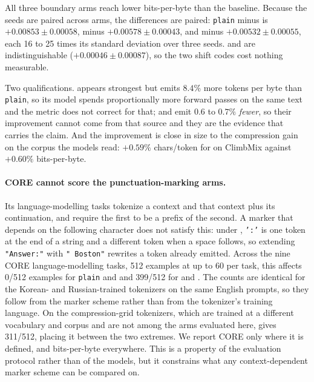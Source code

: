 \providecommand{\downstreamdir}{.}


All three boundary arms reach lower bits-per-byte than the baseline. Because the seeds are
paired across arms, the differences are paired: \texttt{plain} minus  is
$+0.00853 \pm 0.00058$, minus  $+0.00578 \pm 0.00043$, and minus 
$+0.00532 \pm 0.00055$, each 16 to 25 times its standard deviation over three seeds.
 and  are indistinguishable ($+0.00046 \pm 0.00087$), so the two
shift codes cost nothing measurable.

Two qualifications.  appears strongest but emits $8.4\%$ more tokens per byte than
\texttt{plain}, so its model spends proportionally more forward passes on the same text and
the metric does not correct for that;  and  emit $0.6$ to $0.7\%$
\emph{fewer}, so their improvement cannot come from that source and they are the evidence
that carries the claim. And the improvement is close in size to the compression gain on the
corpus the models read: $+0.59\%$ chars/token for  on ClimbMix against $+0.60\%$
bits-per-byte.

\paragraph{CORE cannot score the punctuation-marking arms.} Its language-modelling tasks
tokenize a context and that context plus its continuation, and require the first to be a
prefix of the second. A marker that depends on the following character does not satisfy this:
under , \texttt{':'} is one token at the end of a string and a different token when a
space follows, so extending \texttt{"Answer:"} with \texttt{" Boston"} rewrites a token
already emitted. Across the nine CORE language-modelling tasks, 512 examples at up to 60 per
task, this affects 0/512 examples for \texttt{plain} and  and 399/512 for 
and . The counts are identical for the Korean- and Russian-trained tokenizers
on the same English prompts, so they follow from the marker scheme rather than from the
tokenizer's training language. On the compression-grid tokenizers, which are trained at a
different vocabulary and corpus and are not among the arms evaluated here,  gives
311/512, placing it between the two extremes. We report CORE
only where it is defined, and bits-per-byte everywhere. This is a property of the evaluation
protocol rather than of the models, but it constrains what any context-dependent marker scheme
can be compared on.
